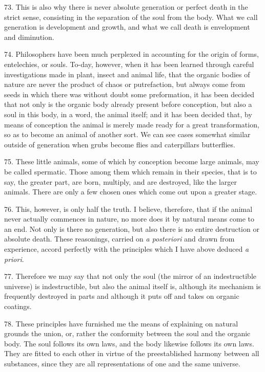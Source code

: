 73. This is also why there is never absolute generation or perfect
death in the strict sense, consisting in the separation of the soul
from the body. What we call generation is development and growth, and
what we call death is envelopment and diminution.

74. Philosophers have been much perplexed in accounting for the origin
of forms, entelechies, or souls. To-day, however, when it has been
learned through careful investigations made in plant, insect and
animal life, that the organic bodies of nature are never the product
of chaos or putrefaction, but always come from seeds in which there
was without doubt some preformation, it has been decided that not
only is the organic body already present before conception, but also a
soul in this body, in a word, the animal itself; and it has been
decided that, by means of conception the animal is merely made ready
for a great transformation, so as to become an animal of another sort.
We can see cases somewhat similar outside of generation when grubs
become flies and caterpillars butterflies.

75. These little animals, some of which by conception become large
animals, may be called spermatic. Those  among them which
remain in their species, that is to say, the greater part, are born,
multiply, and are destroyed, like the larger animals. There are only a
few chosen ones which come out upon a greater stage.

76. This, however, is only half the truth. I believe, therefore, that
if the animal never actually commences in nature, no more does it by
natural means come to an end. Not only is there no generation, but
also there is no entire destruction or absolute death. These
reasonings, carried on \textit{a posteriori} and drawn from
experience, accord perfectly with the principles which I have above
deduced \textit{a priori}.

77. Therefore we may say that not only the soul (the mirror of an
indestructible universe) is indestructible, but also the animal itself
is, although its mechanism is frequently destroyed in parts and
although it puts off and takes on organic coatings.


78. These principles have furnished me the means of explaining on
natural \linebreak[4] grounds the union, or, rather the conformity
between the soul and the organic body. The soul follows its own laws,
and the body likewise follows its own laws. They are fitted to each
other in virtue of the preestablished harmony between all
substances, since they are all representations of one and the same
universe.

